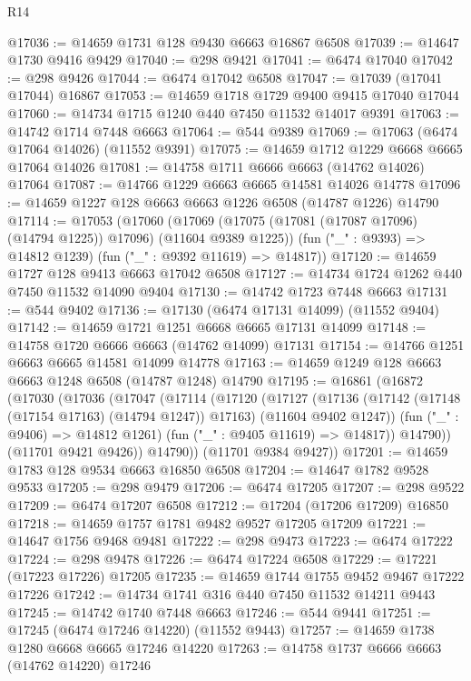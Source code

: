 \begin{lexlean}{R14}
\begin{coremodule}
{{{{{{{{{{{{{{{{{{{{{{{{{{{{{{{{{{{{{{{{{{{{{{{{{{{{{{{{{{{{{{{{{{{{{{{{{{{{{{{{{{@17036 := @14659 @1731 @128 @9430 @6663 @16867 @6508
@17039 := @14647 @1730 @9416 @9429
@17040 := @298 @9421
@17041 := @6474 @17040
@17042 := @298 @9426
@17044 := @6474 @17042 @6508
@17047 := @17039 (@17041 @17044) @16867
@17053 := @14659 @1718 @1729 @9400 @9415 @17040 @17044
@17060 := @14734 @1715 @1240 @440 @7450 @11532 @14017 @9391
@17063 := @14742 @1714 @7448 @6663
@17064 := @544 @9389
@17069 := @17063 (@6474 @17064 @14026) (@11552 @9391)
@17075 := @14659 @1712 @1229 @6668 @6665 @17064 @14026
@17081 := @14758 @1711 @6666 @6663 (@14762 @14026) @17064
@17087 := @14766 @1229 @6663 @6665 @14581 @14026 @14778
@17096 := @14659 @1227 @128 @6663 @6663 @1226 @6508 (@14787 @1226) @14790
@17114 := @17053
    (@17060
      (@17069 (@17075 (@17081 (@17087 @17096) (@14794 @1225)) @17096) (@11604 @9389 @1225))
      (fun ("_" : @9393) => @14812 @1239)
      (fun ("_" : @9392 @11619) => @14817))
@17120 := @14659 @1727 @128 @9413 @6663 @17042 @6508
@17127 := @14734 @1724 @1262 @440 @7450 @11532 @14090 @9404
@17130 := @14742 @1723 @7448 @6663
@17131 := @544 @9402
@17136 := @17130 (@6474 @17131 @14099) (@11552 @9404)
@17142 := @14659 @1721 @1251 @6668 @6665 @17131 @14099
@17148 := @14758 @1720 @6666 @6663 (@14762 @14099) @17131
@17154 := @14766 @1251 @6663 @6665 @14581 @14099 @14778
@17163 := @14659 @1249 @128 @6663 @6663 @1248 @6508 (@14787 @1248) @14790
@17195 := @16861
    (@16872
      (@17030
        (@17036
          (@17047
            (@17114
              (@17120
                (@17127
                  (@17136
                    (@17142 (@17148 (@17154 @17163) (@14794 @1247)) @17163)
                    (@11604 @9402 @1247))
                  (fun ("_" : @9406) => @14812 @1261)
                  (fun ("_" : @9405 @11619) => @14817))
                @14790))
            (@11701 @9421 @9426))
          @14790))
      (@11701 @9384 @9427))
@17201 := @14659 @1783 @128 @9534 @6663 @16850 @6508
@17204 := @14647 @1782 @9528 @9533
@17205 := @298 @9479
@17206 := @6474 @17205
@17207 := @298 @9522
@17209 := @6474 @17207 @6508
@17212 := @17204 (@17206 @17209) @16850
@17218 := @14659 @1757 @1781 @9482 @9527 @17205 @17209
@17221 := @14647 @1756 @9468 @9481
@17222 := @298 @9473
@17223 := @6474 @17222
@17224 := @298 @9478
@17226 := @6474 @17224 @6508
@17229 := @17221 (@17223 @17226) @17205
@17235 := @14659 @1744 @1755 @9452 @9467 @17222 @17226
@17242 := @14734 @1741 @316 @440 @7450 @11532 @14211 @9443
@17245 := @14742 @1740 @7448 @6663
@17246 := @544 @9441
@17251 := @17245 (@6474 @17246 @14220) (@11552 @9443)
@17257 := @14659 @1738 @1280 @6668 @6665 @17246 @14220
@17263 := @14758 @1737 @6666 @6663 (@14762 @14220) @17246
}}}}}}}}}}}}}}}}}}}}}}}}}}}}}}}}}}}}}}}}}}}}}}}}}}}}}}}}}}}}}}}}}}}}}}}}}}}}}}}}}}
\end{coremodule}
\end{lexlean}
